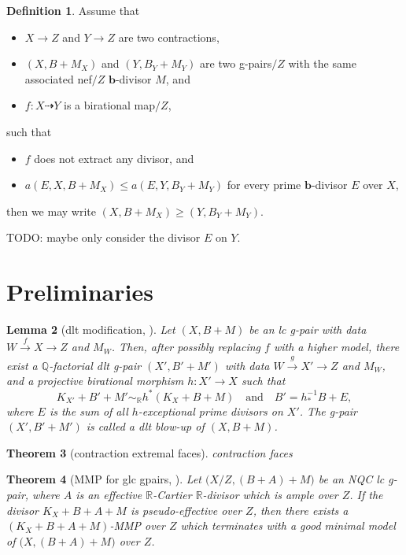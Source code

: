 \documentclass[11pt]{amsart}
\numberwithin{equation}{section}
\newcommand{\bb}{\bm{b}}
\newtheorem{thm}{Theorem}[section]
\newtheorem{lem}[thm]{Lemma}
\theoremstyle{definition}
\newtheorem{defn}[thm]{Definition}
\theoremstyle{definition}
\theoremstyle{definition}
\begin{document}
\begin{defn}
Assume that
\begin{itemize}
    \item $X\rightarrow Z$ and $Y\rightarrow Z$ are two contractions,
    \item $(X,B+M_X)$ and $(Y,B_Y+M_Y)$ are two g-pairs$/Z$ with the same associated nef$/Z$ $\bb$-divisor $M$, and
    \item $f: X\dashrightarrow Y$ is a birational map$/Z$,
\end{itemize}
such that
\begin{itemize}
    \item $f$ does not extract any divisor, and
    \item $a(E,X,B+M_X)\leq a(E,Y,B_Y+M_Y)$ for every prime $\bb$-divisor $E$ over $X$,
\end{itemize}
then we may write $(X,B+M_X)\geq (Y,B_Y+M_Y)$.
\end{defn}

TODO: maybe only consider the divisor $E$ on $Y$.  

\section{Preliminaries}

	\begin{lem}[dlt modification, {\cite[Proposition 3.10]{HL22}}]\label{lem: dlt modification}
		Let $ (X,B+M) $ be an lc g-pair with data $ W \xrightarrow{f} X \to Z $ and $ M_W $. Then, after possibly replacing $ f $ with a higher model, there exist a $\mathbb{Q}$-factorial dlt g-pair $(X',B'+M')$ with data $ W \xrightarrow{g}  X' \to Z $ and $ M_W $, and a projective birational morphism $ h \colon X' \to X $ such that 
		\[ K_{X'} + B' + M' \sim_\mathbb{R} h^* (K_X + B + M) \quad \text{and} \quad B' = h_*^{-1} B + E , \]
		where $ E $ is the sum of all $ h $-exceptional prime divisors on $ X' $. The g-pair $(X',B'+M')$ is called a \emph{dlt blow-up} of $(X,B+M)$.
	\end{lem}

\begin{thm}[contraction extremal faces]\label{thm: contraction extremal face glc}
  contraction faces
\end{thm}

\begin{thm}[MMP for glc gpairs, {\cite[Theorem 4.4]{TX23}}]\label{thm: gen pair mmp}
		Let $ \big( X/Z,(B+A)+M \big) $ be an NQC lc g-pair, where $ A $ is an effective $ \mathbb{R} $-Cartier $\mathbb{R}$-divisor which is ample over $ Z $. If the divisor $K_X+B+A+M$ is pseudo-effective over $Z$, then there exists a $(K_X+B+A+M)$-MMP over $Z$ which terminates with a good minimal model of $ \big( X,(B+A)+M \big) $ over $ Z $.
\end{thm}
\end{document}
